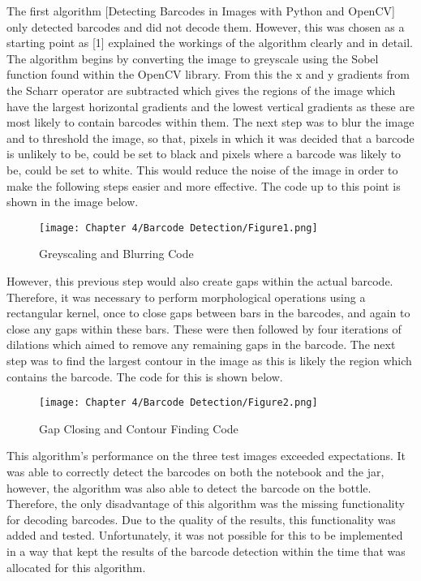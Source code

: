 The first algorithm [Detecting Barcodes in Images with Python and OpenCV] only detected barcodes and did not decode them.
However, this was chosen as a starting point as [1] explained the workings of the algorithm clearly and in detail.
The algorithm begins by converting the image to greyscale using the Sobel function found within the OpenCV library.
From this the x and y gradients from the Scharr operator are subtracted which gives the regions of the image which have the largest horizontal gradients and the lowest vertical gradients as these are most likely to contain barcodes within them.
The next step was to blur the image and to threshold the image, so that, pixels in which it was decided that a barcode is unlikely to be, could be set to black and pixels where a barcode was likely to be, could be set to white.
This would reduce the noise of the image in order to make the following steps easier and more effective.
The code up to this point is shown in the image below.

\begin{figure}[H]        
    \centering
    \texttt{[image: Chapter 4/Barcode Detection/Figure1.png]}
    \caption{Greyscaling and Blurring Code}
    \label{fig:bc1}
\end{figure} 

However, this previous step would also create gaps within the actual barcode.
Therefore, it was necessary to perform morphological operations using a rectangular kernel, once to close gaps between bars in the barcodes, and again to close any gaps within these bars.
These were then followed by four iterations of dilations which aimed to remove any remaining gaps in the barcode.
The next step was to find the largest contour in the image as this is likely the region which contains the barcode.
The code for this is shown below.

\begin{figure}[H]        
    \centering
    \texttt{[image: Chapter 4/Barcode Detection/Figure2.png]}
    \caption{Gap Closing and Contour Finding Code}
    \label{fig:bc2}
\end{figure} 

This algorithm's performance on the three test images exceeded expectations.
It was able to correctly detect the barcodes on both the notebook and the jar, however, the algorithm was also able to detect the barcode on the bottle.
Therefore, the only disadvantage of this algorithm was the missing functionality for decoding barcodes.
Due to the quality of the results, this functionality was added and tested.
Unfortunately, it was not possible for this to be implemented in a way that kept the results of the barcode detection within the time that was allocated for this algorithm.

